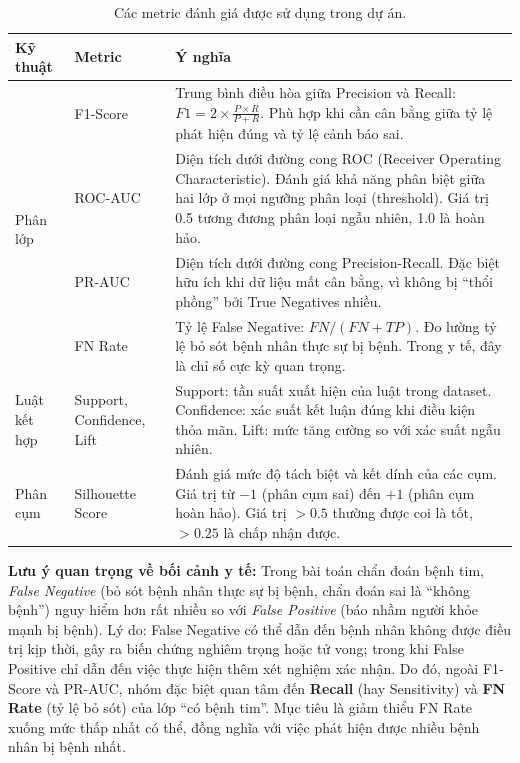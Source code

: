 \begin{table}[H]
\centering
\caption{Các metric đánh giá được sử dụng trong dự án.}
\label{tab:metrics}
\begin{tabular}{|l|l|p{7cm}|}
\hline
\textbf{Kỹ thuật} & \textbf{Metric} & \textbf{Ý nghĩa} \\ \hline
\multirow{4}{*}{Phân lớp} & F1-Score & Trung bình điều hòa giữa Precision và Recall: $F1 = 2 \times \frac{P \times R}{P + R}$. Phù hợp khi cần cân bằng giữa tỷ lệ phát hiện đúng và tỷ lệ cảnh báo sai. \\ \cline{2-3}
 & ROC-AUC & Diện tích dưới đường cong ROC (Receiver Operating Characteristic). Đánh giá khả năng phân biệt giữa hai lớp ở mọi ngưỡng phân loại (threshold). Giá trị 0.5 tương đương phân loại ngẫu nhiên, 1.0 là hoàn hảo. \\ \cline{2-3}
 & PR-AUC & Diện tích dưới đường cong Precision-Recall. Đặc biệt hữu ích khi dữ liệu mất cân bằng, vì không bị ``thổi phồng'' bởi True Negatives nhiều. \\ \cline{2-3}
 & FN Rate & Tỷ lệ False Negative: $FN/(FN + TP)$. Đo lường tỷ lệ bỏ sót bệnh nhân thực sự bị bệnh. Trong y tế, đây là chỉ số cực kỳ quan trọng. \\ \hline
Luật kết hợp & Support, Confidence, Lift & Support: tần suất xuất hiện của luật trong dataset. Confidence: xác suất kết luận đúng khi điều kiện thỏa mãn. Lift: mức tăng cường so với xác suất ngẫu nhiên. \\ \hline
Phân cụm & Silhouette Score & Đánh giá mức độ tách biệt và kết dính của các cụm. Giá trị từ $-1$ (phân cụm sai) đến $+1$ (phân cụm hoàn hảo). Giá trị $> 0.5$ thường được coi là tốt, $> 0.25$ là chấp nhận được. \\ \hline
\end{tabular}
\end{table}

\textbf{Lưu ý quan trọng về bối cảnh y tế:} Trong bài toán chẩn đoán bệnh tim, \textit{False Negative} (bỏ sót bệnh nhân thực sự bị bệnh, chẩn đoán sai là ``không bệnh'') nguy hiểm hơn rất nhiều so với \textit{False Positive} (báo nhầm người khỏe mạnh bị bệnh). Lý do: False Negative có thể dẫn đến bệnh nhân không được điều trị kịp thời, gây ra biến chứng nghiêm trọng hoặc tử vong; trong khi False Positive chỉ dẫn đến việc thực hiện thêm xét nghiệm xác nhận. Do đó, ngoài F1-Score và PR-AUC, nhóm đặc biệt quan tâm đến \textbf{Recall} (hay Sensitivity) và \textbf{FN Rate} (tỷ lệ bỏ sót) của lớp ``có bệnh tim''. Mục tiêu là giảm thiểu FN Rate xuống mức thấp nhất có thể, đồng nghĩa với việc phát hiện được nhiều bệnh nhân bị bệnh nhất.

